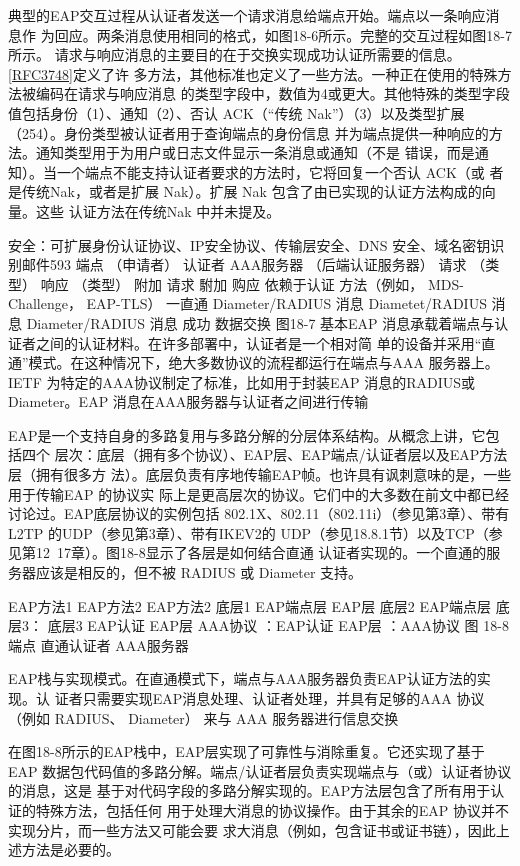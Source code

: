 典型的EAP交互过程从认证者发送一个请求消息给端点开始。端点以一条响应消息作
为回应。两条消息使用相同的格式，如图18-6所示。完整的交互过程如图18-7所示。
请求与响应消息的主要目的在于交换实现成功认证所需要的信息。\href{https://www.rfc-editor.org/rfc/rfc3748}{[RFC3748]}定义了许
多方法，其他标准也定义了一些方法。一种正在使用的特殊方法被编码在请求与响应消息
的类型字段中，数值为4或更大。其他特殊的类型字段值包括身份（1）、通知（2）、否认
ACK（“传统 Nak”）（3）以及类型扩展（254）。身份类型被认证者用于查询端点的身份信息
并为端点提供一种响应的方法。通知类型用于为用户或日志文件显示一条消息或通知（不是
错误，而是通知）。当一个端点不能支持认证者要求的方法时，它将回复一个否认 ACK（或
者是传统Nak，或者是扩展 Nak）。扩展 Nak 包含了由已实现的认证方法构成的向量。这些
认证方法在传统Nak 中并未提及。

安全：可扩展身份认证协议、IP安全协议、传输层安全、DNS 安全、域名密钥识别邮件593
端点
（申请者）
认证者
AAA服务器
（后端认证服务器）
请求
（类型）
响应
（类型）
附加
请求
駙加
购应
依赖于认证
方法（例如，
MDS-Challenge，
EAP-TLS）
一直通
Diameter/RADIUS
消息
Diametet/RADIUS
消息
Diameter/RADIUS
消息
成功
数据交换
图18-7
基本EAP 消息承载着端点与认证者之间的认证材料。在许多部署中，认证者是一个相对简
单的设备并采用“直通”模式。在这种情况下，绝大多数协议的流程都运行在端点与AAA
服务器上。IETF 为特定的AAA协议制定了标准，比如用于封装EAP 消息的RADIUS或
Diameter。EAP 消息在AAA服务器与认证者之间进行传输

EAP是一个支持自身的多路复用与多路分解的分层体系结构。从概念上讲，它包括四个
层次：底层（拥有多个协议）、EAP层、EAP端点/认证者层以及EAP方法层（拥有很多方
法）。底层负责有序地传输EAP帧。也许具有讽刺意味的是，一些用于传输EAP 的协议实
际上是更高层次的协议。它们中的大多数在前文中都已经讨论过。EAP底层协议的实例包括
802.1X、802.11（802.11i）（参见第3章）、带有L2TP 的UDP（参见第3章）、带有IKEV2的
UDP（参见18.8.1节）以及TCP（参见第12~17章）。图18-8显示了各层是如何结合直通
认证者实现的。一个直通的服务器应该是相反的，但不被 RADIUS 或 Diameter 支持。

EAP方法1
EAP方法2
EAP方法2
底层1
EAP端点层
EAP层
底层2
EAP端点层
底层3：
底层3
EAP认证
EAP层
AAA协议
：EAP认证
EAP层
：AAA协议
图 18-8
端点
直通认证者
AAA服务器

EAP栈与实现模式。在直通模式下，端点与AAA服务器负责EAP认证方法的实现。认
证者只需要实现EAP消息处理、认证者处理，并具有足够的AAA 协议（例如 RADIUS、
Diameter） 来与 AAA 服务器进行信息交换

在图18-8所示的EAP栈中，EAP层实现了可靠性与消除重复。它还实现了基于EAP
数据包代码值的多路分解。端点/认证者层负责实现端点与（或）认证者协议的消息，这是
基于对代码字段的多路分解实现的。EAP方法层包含了所有用于认证的特殊方法，包括任何
用于处理大消息的协议操作。由于其余的EAP 协议并不实现分片，而一些方法又可能会要
求大消息（例如，包含证书或证书链），因此上述方法是必要的。

